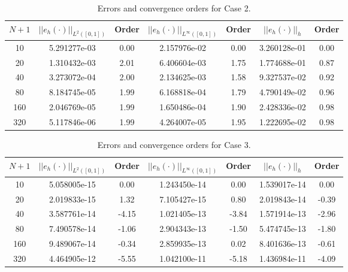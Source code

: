 \documentclass[a4paper, 12pt]{article}
\begin{document}
\begin{table}[!ht]
\caption{Errors and convergence orders for Case 2.}
\vspace{0.1in}
\centering
\begin{tabular}{|c|c|c| c| c| c| c|}
\hline
 $N+1$&  $||e_h(\cdot)||_{L^2([0,1])}$ & Order  & $||e_h(\cdot)||_{L^\infty([0,1])}$ & Order& $||e_h(\cdot)||_h$& Order \\
 \hline
     10  & 5.291277e-03 & 0.00 & 2.157976e-02 & 0.00 & 3.260128e-01 & 0.00\\
     20  & 1.310432e-03 & 2.01 & 6.406604e-03 & 1.75 & 1.774688e-01 & 0.87\\
     40  & 3.273072e-04 & 2.00 & 2.134625e-03 & 1.58 & 9.327537e-02 & 0.92\\
     80  & 8.184745e-05 & 1.99 & 6.168818e-04 & 1.79 & 4.790149e-02 & 0.96\\
     160 & 2.046769e-05 & 1.99 & 1.650486e-04 & 1.90 & 2.428336e-02 & 0.98\\
     320 & 5.117846e-06 & 1.99 & 4.264007e-05 & 1.95 & 1.222695e-02 & 0.98\\
\hline
\end{tabular}
\label{tab:C2}
\end{table}

\begin{table}[!ht]
\caption{Errors and convergence orders for Case 3.}
\vspace{0.1in}
\centering
\begin{tabular}{|c|c|c| c| c| c| c|}
\hline
 $N+1$&  $||e_h(\cdot)||_{L^2([0,1])}$ & Order  & $||e_h(\cdot)||_{L^\infty([0,1])}$ & Order& $||e_h(\cdot)||_h$& Order \\
 \hline
     10  & 5.058005e-15 &  0.00 & 1.243450e-14 &  0.00 & 1.539017e-14 &  0.00\\
     20  & 2.019833e-15 &  1.32 & 7.105427e-15 &  0.80 & 2.019843e-14 & -0.39\\
     40  & 3.587761e-14 & -4.15 & 1.021405e-13 & -3.84 & 1.571914e-13 & -2.96\\
     80  & 7.490578e-14 & -1.06 & 2.904343e-13 & -1.50 & 5.474745e-13 & -1.80\\
     160 & 9.489067e-14 & -0.34 & 2.859935e-13 &  0.02 & 8.401636e-13 & -0.61\\
     320 & 4.464905e-12 & -5.55 & 1.042100e-11 & -5.18 & 1.436984e-11 & -4.09\\
\hline
\end{tabular}
\label{tab:C3}
\end{table}
\end{document}
